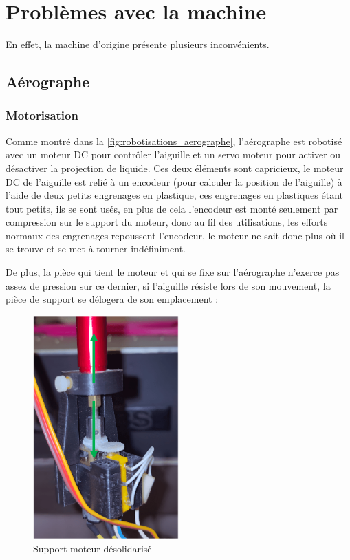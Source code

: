 \newpage
\section{Problèmes avec la machine}
En effet, la machine d'origine présente plusieurs inconvénients.
\subsection{Aérographe}
\subsubsection{Motorisation}
Comme montré dans la \autoref{fig:robotisations_aerographe}, l'aérographe est robotisé avec un moteur DC pour contrôler l'aiguille et un servo moteur pour activer
ou désactiver la projection de liquide. Ces deux éléments sont capricieux, le moteur DC de l'aiguille est relié à un encodeur (pour calculer la position de l'aiguille) à l'aide de deux petits engrenages en
plastique, ces engrenages en plastiques étant tout petits, ils se sont usés, en plus de cela l'encodeur est monté seulement par compression sur le support du moteur, donc au fil des utilisations, les efforts
normaux des engrenages repoussent l'encodeur, le moteur ne sait donc plus où il se trouve et se met à tourner indéfiniment.

De plus, la pièce qui tient le moteur et qui se fixe sur l'aérographe n'exerce pas assez de pression sur ce dernier, si l'aiguille résiste lors de son mouvement,
la pièce de support se délogera de son emplacement :

\begin{figure}[H]
    \centering
    \includegraphics[width = 0.5\textwidth]{assets/figures/situation_initiale/moteur_desolidarisation_aerographe.png}
    \caption{Support moteur désolidarisé}
\end{figure}


